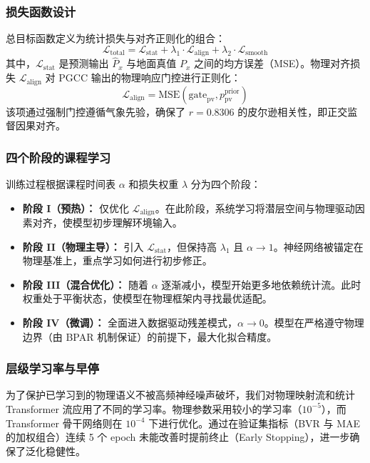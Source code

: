 \subsubsection{损失函数设计}
总目标函数定义为统计损失与对齐正则化的组合：
\begin{equation}
    \mathcal{L}_{\text{total}} = \mathcal{L}_{\text{stat}} + \lambda_1 \cdot \mathcal{L}_{\text{align}} + \lambda_2 \cdot \mathcal{L}_{\text{smooth}}
\label{eq:total_loss}
\end{equation}
其中，$\mathcal{L}_{\text{stat}}$ 是预测输出 $\hat{P}_{x}$ 与地面真值 $P_{x}$ 之间的均方误差（MSE）。物理对齐损失 $\mathcal{L}_{\text{align}}$ 对 PGCC 输出的物理响应门控进行正则化：
\begin{equation}
    \mathcal{L}_{\text{align}} = \text{MSE}(\text{gate}_{\text{pv}}, p_{\text{pv}}^{\text{prior}})
\label{eq:align_loss}
\end{equation}
该项通过强制门控遵循气象先验，确保了 $r=0.8306$ 的皮尔逊相关性，即正交监督因果对齐。

\subsubsection{四个阶段的课程学习}
训练过程根据课程时间表 $\alpha$ 和损失权重 $\lambda$ 分为四个阶段：
\begin{itemize}
    \item \textbf{阶段 I（预热）：} 仅优化 $\mathcal{L}_{\text{align}}$。在此阶段，系统学习将潜层空间与物理驱动因素对齐，使模型初步理解环境输入。
    \item \textbf{阶段 II（物理主导）：} 引入 $\mathcal{L}_{\text{stat}}$，但保持高 $\lambda_1$ 且 $\alpha \to 1$。神经网络被锚定在物理基准上，重点学习如何进行初步修正。
    \item \textbf{阶段 III（混合优化）：} 随着 $\alpha$ 逐渐减小，模型开始更多地依赖统计流。此时权重处于平衡状态，使模型在物理框架内寻找最优适配。
    \item \textbf{阶段 IV（微调）：} 全面进入数据驱动残差模式，$\alpha \to 0$。模型在严格遵守物理边界（由 BPAR 机制保证）的前提下，最大化拟合精度。
\end{itemize}

\subsubsection{层级学习率与早停}
为了保护已学习到的物理语义不被高频神经噪声破坏，我们对物理映射流和统计 Transformer 流应用了不同的学习率。物理参数采用较小的学习率（$10^{-5}$），而 Transformer 骨干网络则在 $10^{-4}$ 下进行优化。通过在验证集指标（BVR 与 MAE 的加权组合）连续 5 个 epoch 未能改善时提前终止（Early Stopping），进一步确保了泛化稳健性。
